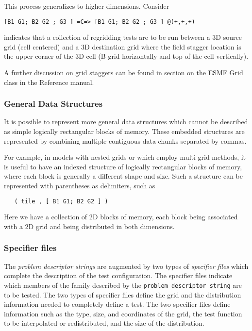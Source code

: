 This process generalizes to higher dimensions. Consider 
\begin{verbatim}
[B1 G1; B2 G2 ; G3 ] =C=> [B1 G1; B2 G2 ; G3 ] @(+,+,+)
\end{verbatim}
indicates that a collection of regridding tests are to be run between a 3D source grid (cell centered) and a 3D destination grid where the field stagger location is the upper corner of the 3D cell (B-grid horizontally and top of the cell vertically).

A further discussion on grid staggers can be found in section on the ESMF Grid class in the Reference manual.  

\subsubsection{General Data Structures}
It is possible to represent more general data structures which cannot be described as simple logically rectangular blocks of memory. These embedded structures are represented by combining multiple contiguous data chunks separated by commas. 

For example, in models with nested grids or which employ multi-grid methods, it is useful to have an indexed structure of  logically rectangular blocks of memory, where each block is generally a different shape and size. Such a structure can be represented with parentheses as delimiters, such as
\begin{center}
\begin{verbatim}
   ( tile , [ B1 G1; B2 G2 ] )
\end{verbatim}
\end{center}
Here we have a collection of 2D blocks of memory, each block being associated with a 2D grid and being distributed in both dimensions.

\subsubsection{Specifier files}
The \textit{problem descriptor strings} are augmented by two types of \textit{specifier files} which complete the description of the test configuration. The specifier files indicate which members of the family described by the \texttt{problem descriptor string} are to be tested. The two types of specifier files define the grid and the distribution information needed to completely define a test. The two specifier files define information such as the type, size, and coordinates of the grid, the test function to be interpolated or redistributed, and the size of the distribution.  


